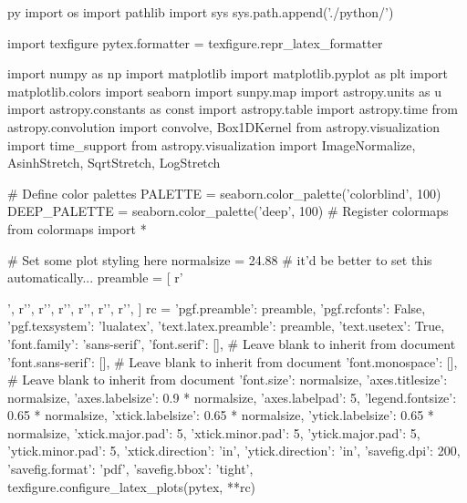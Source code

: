 \begin{pythontexcustomcode}{py}
import os
import pathlib
import sys
sys.path.append('./python/')

import texfigure
pytex.formatter = texfigure.repr_latex_formatter

import numpy as np
import matplotlib
import matplotlib.pyplot as plt
import matplotlib.colors
import seaborn
import sunpy.map
import astropy.units as u
import astropy.constants as const
import astropy.table
import astropy.time
from astropy.convolution import convolve, Box1DKernel
from astropy.visualization import time_support
from astropy.visualization import ImageNormalize, AsinhStretch, SqrtStretch, LogStretch

# Define color palettes
PALETTE = seaborn.color_palette('colorblind', 100)
DEEP_PALETTE = seaborn.color_palette('deep', 100)
# Register colormaps
from colormaps import *

# Set some plot styling here
normalsize = 24.88  # it'd be better to set this automatically...
preamble = [
	r'\usepackage{siunitx}',
	r'\DeclareSIUnit[number-unit-product={}]',
	r'\DeclareSIUnit[number-unit-product={}]',
	r'\DeclareSIUnit[number-unit-product={}]',
	r'\DeclareSIUnit[number-unit-product={}]',
	r'\DeclareSIUnit[number-unit-product={}]',
	r'\DeclareSIUnit[number-unit-product={}]',
]
rc = {
	'pgf.preamble': preamble,
	'pgf.rcfonts': False,
	'pgf.texsystem': 'lualatex',
	'text.latex.preamble': preamble,
	'text.usetex': True,
	'font.family': 'sans-serif',
	'font.serif': [], # Leave blank to inherit from document
	'font.sans-serif': [], # Leave blank to inherit from document
	'font.monospace': [], # Leave blank to inherit from document
	'font.size': normalsize,
	'axes.titlesize': normalsize,
	'axes.labelsize': 0.9 * normalsize,
	'axes.labelpad': 5,
	'legend.fontsize': 0.65 * normalsize,
	'xtick.labelsize': 0.65 * normalsize,
	'ytick.labelsize': 0.65 * normalsize,
	'xtick.major.pad': 5,
	'xtick.minor.pad': 5,
	'ytick.major.pad': 5,
	'ytick.minor.pad': 5,
	'xtick.direction': 'in',
	'ytick.direction': 'in',
	'savefig.dpi': 200,
	'savefig.format': 'pdf',
	'savefig.bbox': 'tight',
}
texfigure.configure_latex_plots(pytex, **rc)

\end{pythontexcustomcode}
